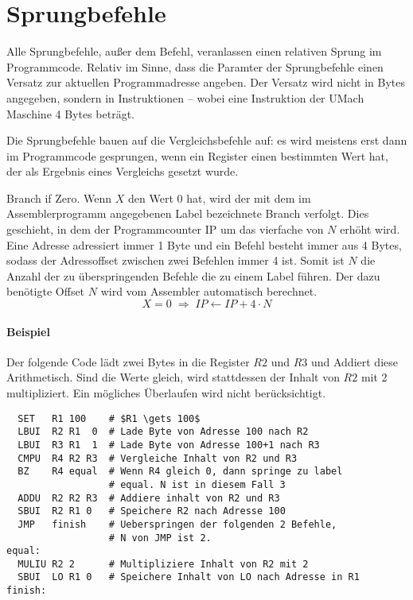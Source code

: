 \section{Sprungbefehle}
\label{sec:Sprungbefehle}

Alle Sprungbefehle, außer dem  Befehl, veranlassen einen 
relativen Sprung im Programmcode. Relativ im Sinne, dass die Paramter der
Sprungbefehle einen Versatz zur aktuellen Programmadresse angeben.
Der Versatz wird nicht in Bytes angegeben, sondern in
Instruktionen -- wobei eine Instruktion der UMach Maschine 4 Bytes beträgt.

Die Sprungbefehle bauen auf die Vergleichsbefehle auf:
es wird meistens erst dann im Programmcode gesprungen, wenn ein Register einen
bestimmten Wert hat, der als Ergebnis eines Vergleichs gesetzt wurde.

\glqq Branch if Zero\grqq. Wenn $X$ den Wert $0$ hat, wird der mit dem im
Assemblerprogramm angegebenen Label bezeichnete Branch verfolgt. Dies geschieht,
in dem der Programmcounter IP um das vierfache von $N$ erhöht wird. Eine Adresse
adressiert immer 1 Byte und ein Befehl besteht immer aus 4 Bytes, sodass der
Adressoffset zwischen zwei Befehlen immer 4 ist. Somit ist $N$ die Anzahl der zu
überspringenden Befehle die zu einem Label führen. Der dazu benötigte Offset $N$
wird vom Assembler automatisch berechnet. 
\[
    X = 0 \; \Rightarrow \;
    IP \gets IP + 4 \cdot N
\]
\paragraph{Beispiel}
Der folgende Code lädt zwei Bytes in die Register $R2$ und $R3$ und Addiert diese
Arithmetisch. Sind die Werte gleich, wird stattdessen der Inhalt von $R2$ mit 2
multipliziert. Ein mögliches Überlaufen wird nicht berücksichtigt.
\begin{lstlisting}
  SET   R1 100    # $R1 \gets 100$
  LBUI  R2 R1  0  # Lade Byte von Adresse 100 nach R2
  LBUI  R3 R1  1  # Lade Byte von Adresse 100+1 nach R3
  CMPU  R4 R2 R3  # Vergleiche Inhalt von R2 und R3
  BZ    R4 equal  # Wenn R4 gleich 0, dann springe zu label
                  # equal. N ist in diesem Fall 3
  ADDU  R2 R2 R3  # Addiere inhalt von R2 und R3
  SBUI  R2 R1 0   # Speichere R2 nach Adresse 100
  JMP   finish    # Ueberspringen der folgenden 2 Befehle, 
                  # N von JMP ist 2.
equal:
  MULIU R2 2      # Multipliziere Inhalt von R2 mit 2
  SBUI  LO R1 0   # Speichere Inhalt von LO nach Adresse in R1
finish:
\end{lstlisting}



